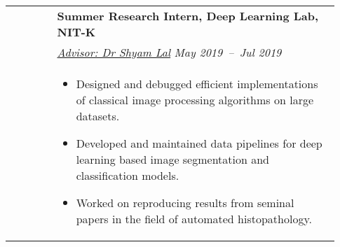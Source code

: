 \documentclass[letterpaper, 10pt, oneside]{article}
\newcommand{\bdit}[1]{{\textbf{#1}}}
\begin{document}
\begin{longtable}{@{} p{0.13\linewidth} p{0.8\linewidth}}
                         & \bdit{Summer Research Intern, Deep Learning Lab, NIT-K}                                                                                                                                                           \\
                         & \textsl{\href{https://ece.nitk.ac.in/faculty/shyam-lal}{Advisor: Dr Shyam Lal}} \hfill \hspace{-3em} \textsl{May 2019\ --\ Jul 2019}                                                                              \\
                         & \parbox{0.8\textwidth}{                                                                                                                                                                                           %
        \begin{itemize}[leftmargin=*, itemsep=-0.88ex, topsep=-0.88ex]
            \item Designed and debugged efficient implementations of classical image processing algorithms on large datasets.
            \item Developed and maintained data pipelines for deep learning based image segmentation and classification models.
            \item Worked on reproducing results from seminal papers in the field of automated histopathology.
        \end{itemize}
    }
    \\
    \\


\end{longtable}
\end{document}
